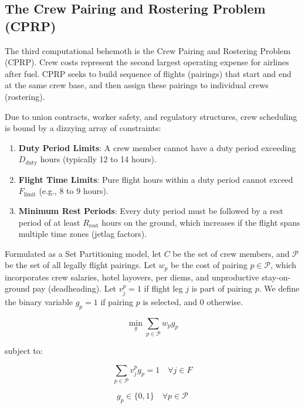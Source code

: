 \documentclass[11pt,a4paper]{book}
\begin{document}
\subsection{The Crew Pairing and Rostering Problem (CPRP)}

The third computational behemoth is the Crew Pairing and Rostering Problem (CPRP). Crew costs represent the second largest operating expense for airlines after fuel. CPRP seeks to build sequence of flights (pairings) that start and end at the same crew base, and then assign these pairings to individual crews (rostering).

Due to union contracts, worker safety, and regulatory structures, crew scheduling is bound by a dizzying array of constraints:
\begin{enumerate}
    \item \textbf{Duty Period Limits}: A crew member cannot have a duty period exceeding $D_{\text{duty}}$ hours (typically 12 to 14 hours).
    \item \textbf{Flight Time Limits}: Pure flight hours within a duty period cannot exceed $F_{\text{limit}}$ (e.g., 8 to 9 hours).
    \item \textbf{Minimum Rest Periods}: Every duty period must be followed by a rest period of at least $R_{\text{rest}}$ hours on the ground, which increases if the flight spans multiple time zones (jetlag factors).
\end{enumerate}

Formulated as a Set Partitioning model, let $C$ be the set of crew members, and $\mathcal{P}$ be the set of all legally flight pairings. Let $w_p$ be the cost of pairing $p \in \mathcal{P}$, which incorporates crew salaries, hotel layovers, per diems, and unproductive stay-on-ground pay (deadheading). Let $v_j^p = 1$ if flight leg $j$ is part of pairing $p$. We define the binary variable $g_p = 1$ if pairing $p$ is selected, and $0$ otherwise.

\begin{equation}
\min_g \sum_{p \in \mathcal{P}} w_p g_p
\end{equation}

subject to:

\begin{equation}
\sum_{p \in \mathcal{P}} v_j^p g_p = 1 \quad \forall j \in F
\end{equation}

\begin{equation}
g_p \in \{0, 1\} \quad \forall p \in \mathcal{P}
\end{equation}
\end{document}
